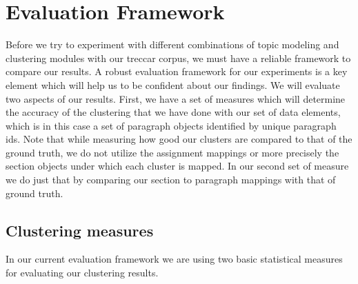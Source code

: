 \section{Evaluation Framework}
\label{sec:3}
Before we try to experiment with different combinations of topic modeling and clustering modules with our treccar corpus, we must have a reliable framework to compare our results. A robust evaluation framework for our experiments is a key element which will help us to be confident about our findings. We will evaluate two aspects of our results. First, we have a set of measures which will determine the accuracy of the clustering that we have done with our set of data elements, which is in this case a set of paragraph objects identified by unique paragraph ids. Note that while measuring how good our clusters are compared to that of the ground truth, we do not utilize the assignment mappings or more precisely the section objects under which each cluster is mapped. In our second set of measure we do just that by comparing our section to paragraph mappings with that of ground truth. 
\subsection{Clustering measures}
\label{sec:4}
In our current evaluation framework we are using two basic statistical measures for evaluating our clustering results.
